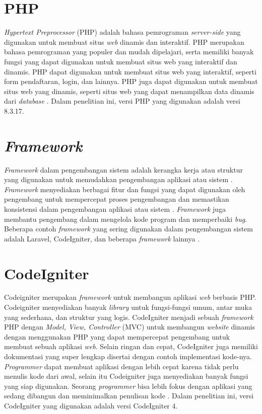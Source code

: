 \section{PHP}
\textit{Hypertext Preprocessor} (PHP) adalah bahasa pemrograman \textit{server-side} yang digunakan untuk membuat situs \textit{web} dinamis dan interaktif. PHP merupakan bahasa pemrograman yang populer dan mudah dipelajari, serta memiliki banyak fungsi yang dapat digunakan untuk membuat situs web yang interaktif dan dinamis. PHP dapat digunakan untuk membuat situs web yang interaktif, seperti form pendaftaran, login, dan lainnya. PHP juga dapat digunakan untuk membuat situs web yang dinamis, seperti situs web yang dapat menampilkan data dinamis dari \textit{database} \cite{Cowls2021ADB}. Dalam penelitian ini, versi PHP yang digunakan adalah versi 8.3.17.

\section{\textit{Framework}}
\textit{Framework} dalam pengembangan sistem adalah kerangka kerja atau struktur yang digunakan untuk memudahkan pengembangan aplikasi atau sistem \cite{sallaby2020perancangan}. \textit{Framework} menyediakan berbagai fitur dan fungsi yang dapat digunakan oleh pengembang untuk mempercepat proses pengembangan dan memastikan konsistensi dalam pengembangan aplikasi atau sistem \cite{simanullang2021sistem}. \textit{Framework} juga membantu pengembang dalam mengelola kode program dan memperbaiki \textit{bug}. Beberapa contoh \textit{framework} yang sering digunakan dalam pengembangan sistem adalah Laravel, CodeIgniter, dan beberapa \textit{framework} lainnya \cite{Fadllullah2022PengembanganSI}.

\section{CodeIgniter}
Codeigniter merupakan \textit{framework} untuk membangun aplikasi \textit{web} berbasis PHP. Codeigniter menyediakan banyak \textit{library} untuk fungsi-fungsi umum, antar muka yang sederhana, dan struktur yang logis. CodeIgniter menjadi sebuah \textit{framework} PHP dengan \textit{Model, View, Controller} (MVC) untuk membangun \textit{website} dinamis dengan menggunakan PHP yang dapat mempercepat pengembang untuk membuat sebuah aplikasi \textit{web}. Selain ringan dan cepat, CodeIgniter juga memiliki dokumentasi yang super lengkap disertai dengan contoh implementasi kode-nya. \textit{Programmer} dapat membuat aplikasi dengan lebih cepat karena tidak perlu menulis kode dari awal, selain itu Codeigniter juga menyediakan banyak fungsi yang siap digunakan. Seorang \textit{programmer} bisa lebih fokus dengan aplikasi yang sedang dibangun dan meminimalkan penulisan kode \cite{tyowati2017implementasi}. Dalam penelitian ini, versi CodeIgniter yang digunakan adalah versi CodeIgniter 4.

